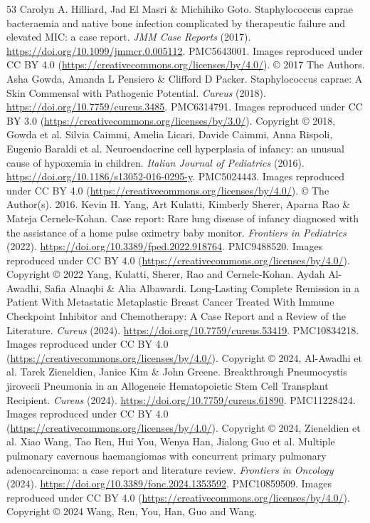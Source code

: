 \begin{thebibliography}{53}
 Carolyn A. Hilliard, Jad El Masri \& Michihiko Goto. Staphylococcus caprae bacteraemia and native bone infection complicated by therapeutic failure and elevated MIC: a case report. \textit{JMM Case Reports} (2017). \url{https://doi.org/10.1099/jmmcr.0.005112}. PMC5643001. Images reproduced under CC BY 4.0 (\url{https://creativecommons.org/licenses/by/4.0/}). © 2017 The Authors.
 Asha Gowda, Amanda L Pensiero \& Clifford D Packer. Staphylococcus caprae: A Skin Commensal with Pathogenic Potential. \textit{Cureus} (2018). \url{https://doi.org/10.7759/cureus.3485}. PMC6314791. Images reproduced under CC BY 3.0 (\url{https://creativecommons.org/licenses/by/3.0/}). Copyright © 2018, Gowda et al.
 Silvia Caimmi, Amelia Licari, Davide Caimmi, Anna Rispoli, Eugenio Baraldi et al. Neuroendocrine cell hyperplasia of infancy: an unusual cause of hypoxemia in children. \textit{Italian Journal of Pediatrics} (2016). \url{https://doi.org/10.1186/s13052-016-0295-y}. PMC5024443. Images reproduced under CC BY 4.0 (\url{https://creativecommons.org/licenses/by/4.0/}). © The Author(s). 2016.
 Kevin H. Yang, Art Kulatti, Kimberly Sherer, Aparna Rao \& Mateja Cernelc-Kohan. Case report: Rare lung disease of infancy diagnosed with the assistance of a home pulse oximetry baby monitor. \textit{Frontiers in Pediatrics} (2022). \url{https://doi.org/10.3389/fped.2022.918764}. PMC9488520. Images reproduced under CC BY 4.0 (\url{https://creativecommons.org/licenses/by/4.0/}). Copyright © 2022 Yang, Kulatti, Sherer, Rao and Cernelc-Kohan.
 Aydah Al-Awadhi, Safia Alnaqbi \& Alia Albawardi. Long-Lasting Complete Remission in a Patient With Metastatic Metaplastic Breast Cancer Treated With Immune Checkpoint Inhibitor and Chemotherapy: A Case Report and a Review of the Literature. \textit{Cureus} (2024). \url{https://doi.org/10.7759/cureus.53419}. PMC10834218. Images reproduced under CC BY 4.0 (\url{https://creativecommons.org/licenses/by/4.0/}). Copyright © 2024, Al-Awadhi et al.
 Tarek Zieneldien, Janice Kim \& John Greene. Breakthrough Pneumocystis jirovecii Pneumonia in an Allogeneic Hematopoietic Stem Cell Transplant Recipient. \textit{Cureus} (2024). \url{https://doi.org/10.7759/cureus.61890}. PMC11228424. Images reproduced under CC BY 4.0 (\url{https://creativecommons.org/licenses/by/4.0/}). Copyright © 2024, Zieneldien et al.
 Xiao Wang, Tao Ren, Hui You, Wenya Han, Jialong Guo et al. Multiple pulmonary cavernous haemangiomas with concurrent primary pulmonary adenocarcinoma: a case report and literature review. \textit{Frontiers in Oncology} (2024). \url{https://doi.org/10.3389/fonc.2024.1353592}. PMC10859509. Images reproduced under CC BY 4.0 (\url{https://creativecommons.org/licenses/by/4.0/}). Copyright © 2024 Wang, Ren, You, Han, Guo and Wang.

\end{thebibliography}
